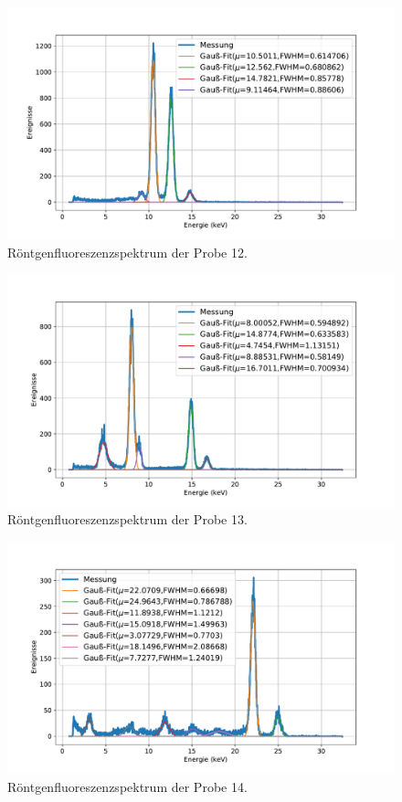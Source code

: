 \documentclass[
	a4paper,
	12pt,
	pagesize,
	ngerman
]{scrartcl}
\begin{document}
	\begin{figure}[H]
		\includegraphics[width=\textwidth]{images/12-X.pdf}
		\centering
		\caption{Röntgenfluoreszenzspektrum der Probe 12.}
	\end{figure}

	\begin{figure}[H]
		\includegraphics[width=\textwidth]{images/13-X.pdf}
		\centering
		\caption{Röntgenfluoreszenzspektrum der Probe 13.}
	\end{figure}

	\begin{figure}[H]
		\includegraphics[width=\textwidth]{images/14-X.pdf}
		\centering
		\caption{Röntgenfluoreszenzspektrum der Probe 14.}
	\end{figure}
\end{document}
